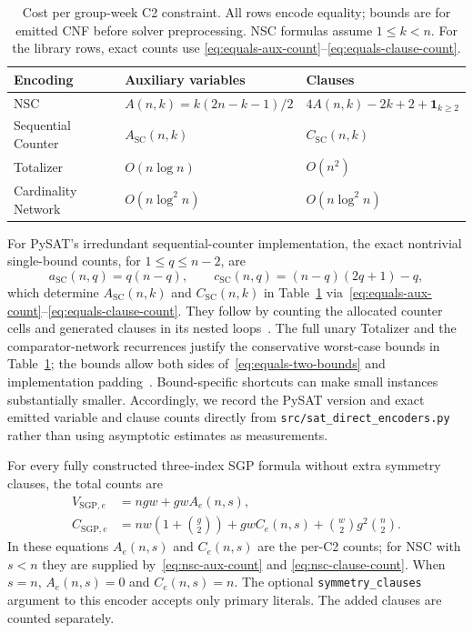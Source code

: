\documentclass[a4paper,fleqn]{cas-sc}
\begin{document}
\begin{table}[pos=!htb]
 \centering
 \caption{Cost per group-week C2 constraint. All rows encode equality;
 bounds are for emitted CNF before solver preprocessing. NSC formulas
 assume $1\leq k<n$. For the library rows, exact counts use
 \eqref{eq:equals-aux-count}--\eqref{eq:equals-clause-count}.}
 \label{tab:cardinality-complexity}
 \small
 \begin{tabular}{@{}lll@{}}
  \toprule
  Encoding & Auxiliary variables & Clauses \\
  \midrule
  NSC & $A(n,k)=k(2n-k-1)/2$ & $4A(n,k)-2k+2+\mathbf{1}_{k\geq2}$ \\
  Sequential Counter & $A_{\mathrm{SC}}(n,k)$ & $C_{\mathrm{SC}}(n,k)$ \\
  Totalizer & $O(n\log n)$ & $O(n^2)$ \\
  Cardinality Network & $O(n\log^2 n)$ & $O(n\log^2 n)$ \\
  \bottomrule
 \end{tabular}
\end{table}

For PySAT's irredundant sequential-counter implementation, the exact
nontrivial single-bound counts, for $1\leq q\leq n-2$, are
\begin{equation}
 a_{\mathrm{SC}}(n,q)=q(n-q),\qquad
 c_{\mathrm{SC}}(n,q)=(n-q)(2q+1)-q,
 \label{eq:sc-implementation-count}
\end{equation}
which determine $A_{\mathrm{SC}}(n,k)$ and $C_{\mathrm{SC}}(n,k)$ in
Table~\ref{tab:cardinality-complexity} via~\eqref{eq:equals-aux-count}--\eqref{eq:equals-clause-count}.
They follow by counting the allocated counter cells and generated clauses
in its nested loops~\cite{pysat-seqcounter-source}. The full unary
Totalizer and the comparator-network recurrences justify the conservative
worst-case bounds in Table~\ref{tab:cardinality-complexity}; the bounds
allow both sides of~\eqref{eq:equals-two-bounds} and implementation
padding~\cite{pysat-totalizer-source,pysat-network-source}. Bound-specific
shortcuts can make small instances substantially smaller. Accordingly,
we record the PySAT version and exact emitted variable and clause counts
directly from \texttt{src/sat\_direct\_encoders.py} rather than using
asymptotic estimates as measurements.

For every fully constructed three-index SGP formula without extra
symmetry clauses,
the total counts are
\begin{align}
 V_{\mathrm{SGP},e}&=ngw+gwA_e(n,s),
 \label{eq:sgp-total-vars}\\
 C_{\mathrm{SGP},e}&=nw\left(1+\binom{g}{2}\right)
      +gwC_e(n,s)+\binom{w}{2}g^2\binom{n}{2}.
 \label{eq:sgp-total-clauses}
\end{align}
In these equations $A_e(n,s)$ and $C_e(n,s)$ are the per-C2 counts; for
NSC with $s<n$ they are supplied by~\eqref{eq:nsc-aux-count} and
\eqref{eq:nsc-clause-count}. When $s=n$, $A_e(n,s)=0$ and $C_e(n,s)=n$.
The optional \texttt{symmetry\_clauses} argument to this encoder accepts
only primary literals. The added clauses are counted separately.
\end{document}
